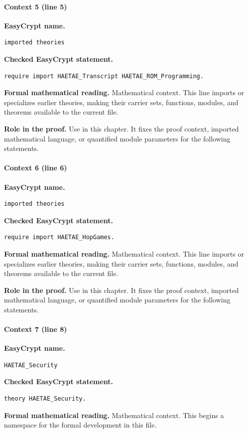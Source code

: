 \paragraph{Context 5 (line 5)}
\noindent\textbf{EasyCrypt name.}
\begin{lstlisting}[language=EasyCrypt,basicstyle=\ttfamily\scriptsize]
imported theories
\end{lstlisting}
\noindent\textbf{Checked EasyCrypt statement.}
\begin{lstlisting}[language=EasyCrypt,basicstyle=\ttfamily\scriptsize]
require import HAETAE_Transcript HAETAE_ROM_Programming.
\end{lstlisting}
\noindent\textbf{Formal mathematical reading.}
Mathematical context. This line imports or specializes earlier theories, making their carrier sets, functions, modules, and theorems available to the current file.

\noindent\textbf{Role in the proof.}
Use in this chapter. It fixes the proof context, imported mathematical language, or quantified module parameters for the following statements.

\paragraph{Context 6 (line 6)}
\noindent\textbf{EasyCrypt name.}
\begin{lstlisting}[language=EasyCrypt,basicstyle=\ttfamily\scriptsize]
imported theories
\end{lstlisting}
\noindent\textbf{Checked EasyCrypt statement.}
\begin{lstlisting}[language=EasyCrypt,basicstyle=\ttfamily\scriptsize]
require import HAETAE_HopGames.
\end{lstlisting}
\noindent\textbf{Formal mathematical reading.}
Mathematical context. This line imports or specializes earlier theories, making their carrier sets, functions, modules, and theorems available to the current file.

\noindent\textbf{Role in the proof.}
Use in this chapter. It fixes the proof context, imported mathematical language, or quantified module parameters for the following statements.

\paragraph{Context 7 (line 8)}
\noindent\textbf{EasyCrypt name.}
\begin{lstlisting}[language=EasyCrypt,basicstyle=\ttfamily\scriptsize]
HAETAE_Security
\end{lstlisting}
\noindent\textbf{Checked EasyCrypt statement.}
\begin{lstlisting}[language=EasyCrypt,basicstyle=\ttfamily\scriptsize]
theory HAETAE_Security.
\end{lstlisting}
\noindent\textbf{Formal mathematical reading.}
Mathematical context. This begins a namespace for the formal development in this file.

